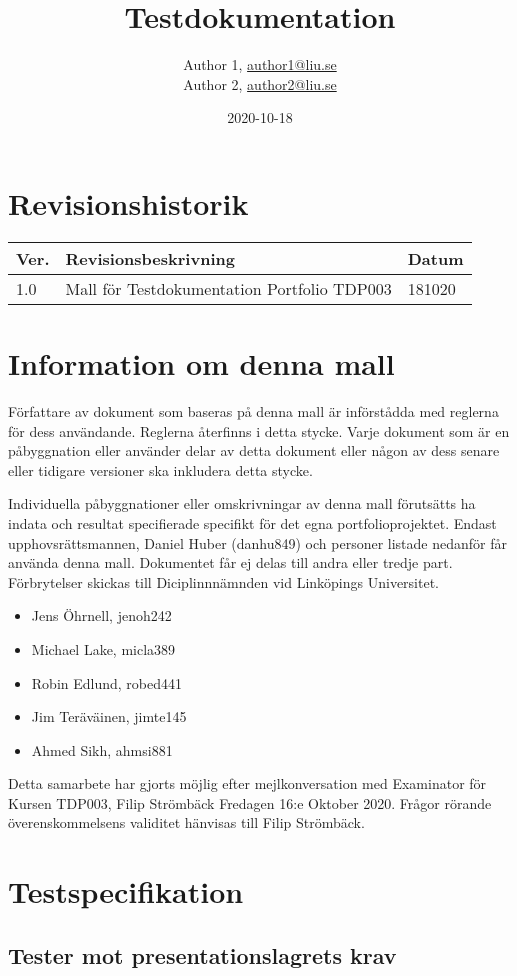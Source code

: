 \documentclass{TDP003mall}
\author{Author 1, \url{author1@liu.se}\\
  Author 2, \url{author2@liu.se}}
\title{Testdokumentation}
\date{2020-10-18}
\begin{document}
\projectpage
\tableofcontents
\section{Revisionshistorik}
\begin{table}[!h]
\begin{tabularx}{\linewidth}{|l|X|l|}
\hline
Ver. & Revisionsbeskrivning & Datum \\\hline
1.0 & Mall för Testdokumentation Portfolio TDP003 & 181020 \\\hline
\end{tabularx}
\end{table}

\section{Information om denna mall}
Författare av dokument som baseras på denna mall är införstådda med reglerna för dess användande. Reglerna återfinns i detta stycke. Varje dokument som är en påbyggnation eller använder delar av detta dokument eller någon av dess senare eller tidigare versioner ska inkludera detta stycke.

Individuella påbyggnationer eller omskrivningar av denna mall förutsätts ha indata och resultat specifierade specifikt för det egna portfolioprojektet. Endast upphovsrättsmannen, Daniel Huber (danhu849) och personer listade nedanför får använda denna mall. Dokumentet får ej delas till andra eller tredje part. Förbrytelser skickas till Diciplinnnämnden vid Linköpings Universitet.
\begin{itemize}
\item Jens Öhrnell, jenoh242
\item Michael Lake, micla389
\item Robin Edlund, robed441
\item Jim Teräväinen, jimte145
\item Ahmed Sikh, ahmsi881
\end{itemize}

Detta samarbete har gjorts möjlig efter mejlkonversation med Examinator för Kursen TDP003, Filip Strömbäck Fredagen 16:e Oktober 2020. Frågor rörande överenskommelsens validitet hänvisas till Filip Strömbäck.

\section{Testspecifikation}

\subsection{Tester mot presentationslagrets krav}
\end{document}
